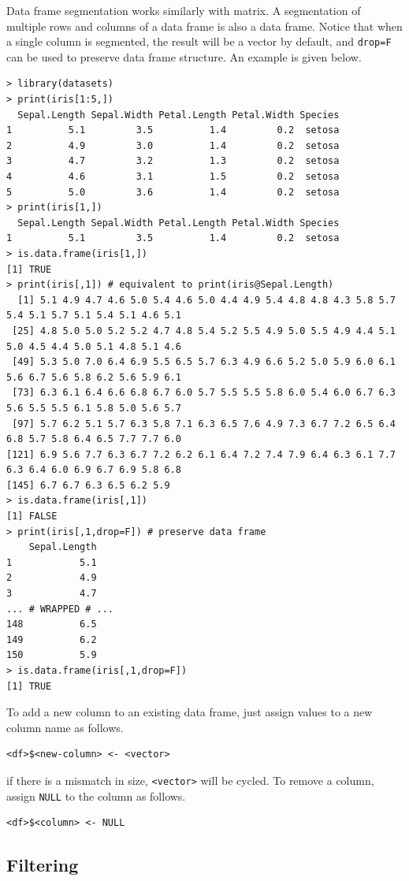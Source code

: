 Data frame segmentation works similarly with matrix. A segmentation of multiple rows and columns of a data frame is also a data frame. Notice that when a single column is segmented, the result will be a vector by default, and \verb|drop=F| can be used to preserve data frame structure. An example is given below.
\begin{lstlisting}
> library(datasets)
> print(iris[1:5,])
  Sepal.Length Sepal.Width Petal.Length Petal.Width Species
1          5.1         3.5          1.4         0.2  setosa
2          4.9         3.0          1.4         0.2  setosa
3          4.7         3.2          1.3         0.2  setosa
4          4.6         3.1          1.5         0.2  setosa
5          5.0         3.6          1.4         0.2  setosa
> print(iris[1,])
  Sepal.Length Sepal.Width Petal.Length Petal.Width Species
1          5.1         3.5          1.4         0.2  setosa
> is.data.frame(iris[1,])
[1] TRUE
> print(iris[,1]) # equivalent to print(iris@Sepal.Length)
  [1] 5.1 4.9 4.7 4.6 5.0 5.4 4.6 5.0 4.4 4.9 5.4 4.8 4.8 4.3 5.8 5.7 5.4 5.1 5.7 5.1 5.4 5.1 4.6 5.1
 [25] 4.8 5.0 5.0 5.2 5.2 4.7 4.8 5.4 5.2 5.5 4.9 5.0 5.5 4.9 4.4 5.1 5.0 4.5 4.4 5.0 5.1 4.8 5.1 4.6
 [49] 5.3 5.0 7.0 6.4 6.9 5.5 6.5 5.7 6.3 4.9 6.6 5.2 5.0 5.9 6.0 6.1 5.6 6.7 5.6 5.8 6.2 5.6 5.9 6.1
 [73] 6.3 6.1 6.4 6.6 6.8 6.7 6.0 5.7 5.5 5.5 5.8 6.0 5.4 6.0 6.7 6.3 5.6 5.5 5.5 6.1 5.8 5.0 5.6 5.7
 [97] 5.7 6.2 5.1 5.7 6.3 5.8 7.1 6.3 6.5 7.6 4.9 7.3 6.7 7.2 6.5 6.4 6.8 5.7 5.8 6.4 6.5 7.7 7.7 6.0
[121] 6.9 5.6 7.7 6.3 6.7 7.2 6.2 6.1 6.4 7.2 7.4 7.9 6.4 6.3 6.1 7.7 6.3 6.4 6.0 6.9 6.7 6.9 5.8 6.8
[145] 6.7 6.7 6.3 6.5 6.2 5.9
> is.data.frame(iris[,1])
[1] FALSE
> print(iris[,1,drop=F]) # preserve data frame
    Sepal.Length
1            5.1
2            4.9
3            4.7
... # WRAPPED # ...
148          6.5
149          6.2
150          5.9
> is.data.frame(iris[,1,drop=F])
[1] TRUE
\end{lstlisting}

To add a new column to an existing data frame, just assign values to a new column name as follows.
\begin{lstlisting}
<df>$<new-column> <- <vector>
\end{lstlisting}
if there is a mismatch in size, \verb|<vector>| will be cycled. To remove a column, assign \verb|NULL| to the column as follows.
\begin{lstlisting}
<df>$<column> <- NULL
\end{lstlisting}

\subsection{Filtering}

